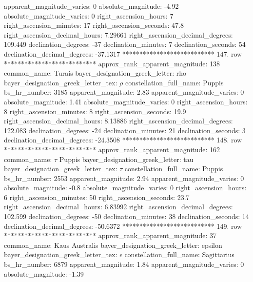          apparent_magnitude_varies: 0
                absolute_magnitude: -4.92
         absolute_magnitude_varies: 0
             right_ascension_hours: 7
           right_ascension_minutes: 17
           right_ascension_seconds: 47.8
     right_ascension_decimal_hours: 7.29661
   right_ascension_decimal_degrees: 109.449
               declination_degrees: -37
               declination_minutes: 7
               declination_seconds: 54
       declination_decimal_degrees: -37.1317
*************************** 147. row ***************************
    approx_rank_apparent_magnitude: 138
                       common_name: Turais
    bayer_designation_greek_letter: rho
bayer_designation_greek_letter_tex: $\rho$
           constellation_full_name: Puppis
                      bs_hr_number: 3185
                apparent_magnitude: 2.83
         apparent_magnitude_varies: 0
                absolute_magnitude: 1.41
         absolute_magnitude_varies: 0
             right_ascension_hours: 8
           right_ascension_minutes: 8
           right_ascension_seconds: 19.9
     right_ascension_decimal_hours: 8.13886
   right_ascension_decimal_degrees: 122.083
               declination_degrees: -24
               declination_minutes: 21
               declination_seconds: 3
       declination_decimal_degrees: -24.3508
*************************** 148. row ***************************
    approx_rank_apparent_magnitude: 162
                       common_name: $\tau$ Puppis
    bayer_designation_greek_letter: tau
bayer_designation_greek_letter_tex: $\tau$
           constellation_full_name: Puppis
                      bs_hr_number: 2553
                apparent_magnitude: 2.94
         apparent_magnitude_varies: 0
                absolute_magnitude: -0.8
         absolute_magnitude_varies: 0
             right_ascension_hours: 6
           right_ascension_minutes: 50
           right_ascension_seconds: 23.7
     right_ascension_decimal_hours: 6.83992
   right_ascension_decimal_degrees: 102.599
               declination_degrees: -50
               declination_minutes: 38
               declination_seconds: 14
       declination_decimal_degrees: -50.6372
*************************** 149. row ***************************
    approx_rank_apparent_magnitude: 37
                       common_name: Kaus Australis
    bayer_designation_greek_letter: epsilon
bayer_designation_greek_letter_tex: $\epsilon$
           constellation_full_name: Sagittarius
                      bs_hr_number: 6879
                apparent_magnitude: 1.84
         apparent_magnitude_varies: 0
                absolute_magnitude: -1.39

